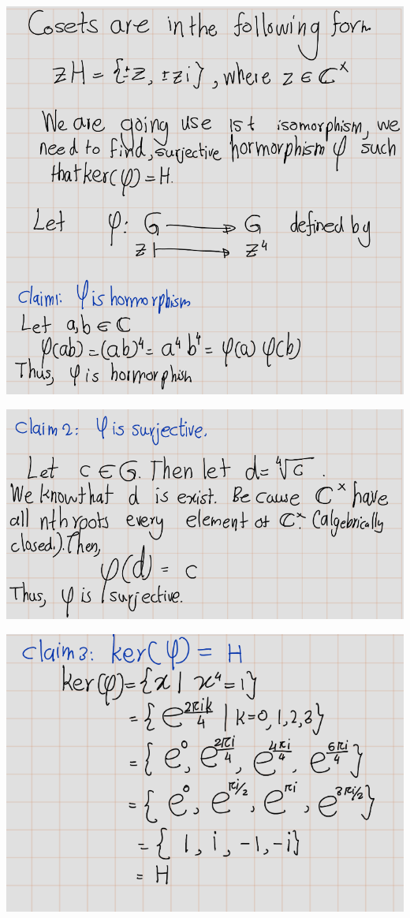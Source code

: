 \documentclass[
]{book}
\theoremstyle{definition}
\theoremstyle{definition}
\theoremstyle{definition}
\theoremstyle{definition}
\theoremstyle{remark}
\begin{document}
\includegraphics{figures/ch_2/fig36.png}

\includegraphics{figures/ch_2/fig37.png}

\includegraphics{figures/ch_2/fig38.png}
\end{document}

